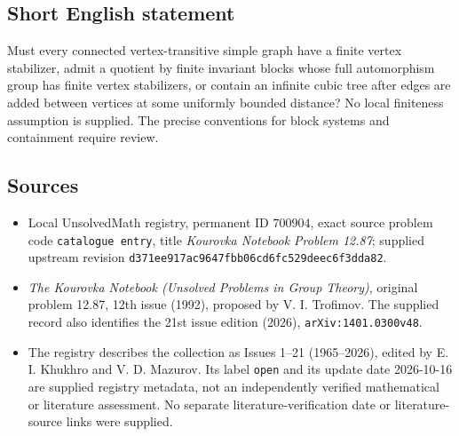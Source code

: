 \documentclass[11pt]{article}
\begin{document}
\subsection{Short English statement}
Must every connected vertex-transitive simple graph have a finite vertex stabilizer, admit a quotient by finite invariant blocks whose full automorphism group has finite vertex stabilizers, or contain an infinite cubic tree after edges are added between vertices at some uniformly bounded distance? No local finiteness assumption is supplied. The precise conventions for block systems and containment require review.
\subsection{Sources}
\begin{itemize}
\item Local UnsolvedMath registry, permanent ID \(700904\), exact source problem code \texttt{catalogue entry}, title \emph{Kourovka Notebook Problem 12.87}; supplied upstream revision \texttt{d371ee917ac9647fbb06cd6fc529deec6f3dda82}.
\item \emph{The Kourovka Notebook (Unsolved Problems in Group Theory)}, original problem 12.87, 12th issue (1992), proposed by V. I. Trofimov. The supplied record also identifies the 21st issue edition (2026), \texttt{arXiv:1401.0300v48}.
\item The registry describes the collection as Issues 1--21 (1965--2026), edited by E. I. Khukhro and V. D. Mazurov. Its label \texttt{open} and its update date 2026-10-16 are supplied registry metadata, not an independently verified mathematical or literature assessment. No separate literature-verification date or literature-source links were supplied.
\end{itemize}
\end{document}

